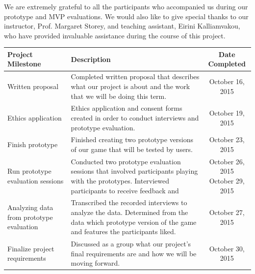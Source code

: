 \documentclass{sigchi}
\begin{document}
We are extremely grateful to all the participants who accompanied us during our prototype and MVP evaluations. We would also like to give special thanks to our instructor, Prof. Margaret Storey, and teaching assistant, Eirini Kalliamvakou, who have provided invaluable assistance during the course of this project.




\onecolumn
{}\label{apx:completed}

\begin{table}[h!]
\centering
\begin{tabular}{>{\raggedright}p{4cm}|>{\raggedright}p{6cm}|c}

\textbf{Project Milestone} &
\textbf{Description} &
\textbf{Date Completed} \\ \hline \hline

Written proposal &
Completed written proposal that describes what our project is about and the work that we will be doing this term. &
October 16, 2015 \\ \hline

Ethics application &
Ethics application and consent forms created in order to conduct interviews and prototype evaluation. &
October 19, 2015 \\ \hline

Finish prototype &
Finished creating two prototype versions of our game that will be tested by users. &
October 23, 2015 \\ \hline

Run prototype evaluation sessions &
Conducted two prototype evaluation sessions that involved participants playing with the prototypes. Interviewed participants to receive feedback and &
\makecell{October 26, 2015 \\ October 29, 2015} \\ \hline 

Analyzing data from prototype evaluation &
Transcribed the recorded interviews to analyze the data. Determined from the data which prototype version of the game and features the participants liked. &
October 27, 2015 \\ \hline

Finalize project requirements &
Discussed as a group what our project’s final requirements are and how we will be moving forward. &
October 30, 2015 \\ \hline


\end{tabular}
\end{table}
\end{document}
